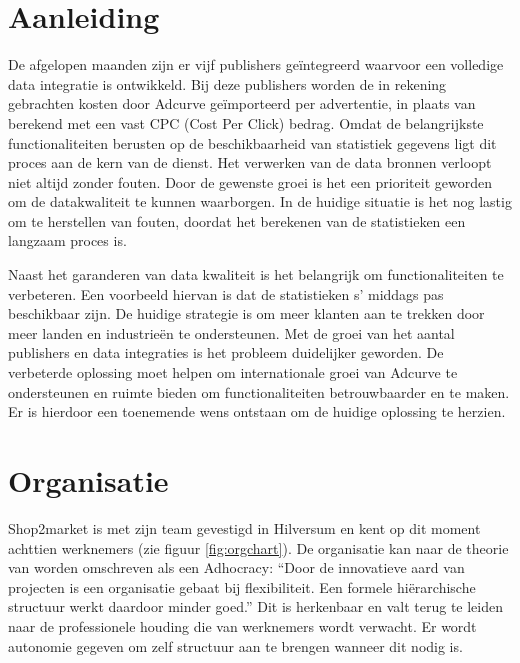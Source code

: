 \clearpage

\section{Aanleiding} %

De afgelopen maanden zijn er vijf publishers geïntegreerd waarvoor een volledige data integratie is ontwikkeld. Bij deze publishers worden de in rekening gebrachten kosten door Adcurve geïmporteerd per advertentie, in plaats van berekend met een vast CPC (Cost Per Click) bedrag.
Omdat de belangrijkste functionaliteiten berusten op de beschikbaarheid van statistiek gegevens ligt dit proces aan de kern van de dienst. Het verwerken van de data bronnen verloopt niet altijd zonder fouten. Door de gewenste groei is het een prioriteit geworden om de datakwaliteit te kunnen waarborgen. In de huidige situatie is het nog lastig om te herstellen van fouten, doordat het berekenen van de statistieken een langzaam proces is.

Naast het garanderen van data kwaliteit is het belangrijk om functionaliteiten te verbeteren. Een voorbeeld hiervan is dat de statistieken s' middags pas beschikbaar zijn. De huidige strategie is om meer klanten aan te trekken door meer landen en industrieën te ondersteunen. Met de groei van het aantal publishers en data integraties is het probleem duidelijker geworden. De verbeterde oplossing moet helpen om internationale groei van Adcurve te ondersteunen en ruimte bieden om functionaliteiten betrouwbaarder en te maken. Er is hierdoor een toenemende wens ontstaan om de huidige oplossing te herzien.

\section{Organisatie} %

Shop2market is met zijn team gevestigd in Hilversum en kent op dit moment achttien werknemers (zie figuur \ref{fig:orgchart}). De organisatie kan naar de theorie van
\autocite{mintzberg} worden omschreven als een Adhocracy: “Door de innovatieve aard van projecten is een organisatie gebaat bij flexibiliteit. Een formele hiërarchische structuur werkt daardoor minder goed.” Dit is herkenbaar en valt terug te leiden naar de professionele houding die van werknemers wordt verwacht. Er wordt autonomie gegeven om zelf structuur aan te brengen wanneer dit nodig is.

